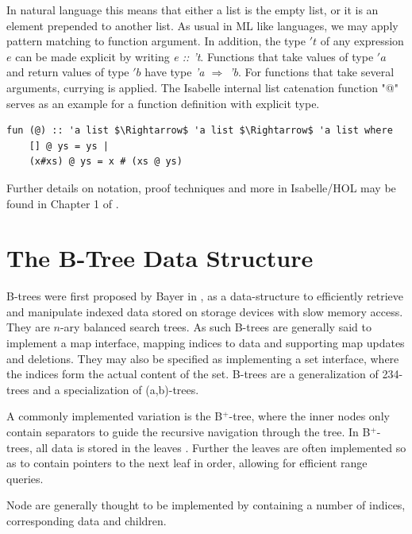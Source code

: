 In natural language this means that either a list is the empty list,
or it is an element prepended to another list.
As usual in ML like languages, we may apply pattern matching to function argument.
In addition, the type $'t$ of any expression $e$ can be
made explicit by writing \textit{e :: 't}.
Functions that take values of type $'a$ and return values of type $'b$ 
have type \textit{'a $\Rightarrow$ 'b}.
For functions that take several arguments,
currying is applied.
The Isabelle internal list catenation function "@" serves as
an example for a function definition with explicit type.

\begin{lstlisting}[mathescape=true, language=Isabelle,label=lst:append-def]
fun (@) :: 'a list $\Rightarrow$ 'a list $\Rightarrow$ 'a list where
    [] @ ys = ys |
    (x#xs) @ ys = x # (xs @ ys)
\end{lstlisting}


Further details on notation, proof techniques and more in Isabelle/HOL
may be found in Chapter 1 of \parencite{DBLP:books/sp/NipkowK14}.


\section{The B-Tree Data Structure}

B-trees were first proposed by Bayer in \parencite{DBLP:journals/acta/BayerM72},
as a data-structure to efficiently retrieve and manipulate
indexed data stored on storage devices with slow memory access.
They are $n$-ary balanced search trees.
As such B-trees are generally said to implement a map interface,
mapping indices to data and supporting map updates and deletions.
They may also be specified as implementing a set interface,
where the indices form the actual content of the set.
B-trees are a generalization of 234-trees and a specialization of (a,b)-trees.

A commonly implemented variation is the B$^+$-tree, where the inner nodes
only contain separators to guide the recursive navigation through the tree.
In B$^+$-trees, all data is stored in the leaves \parencite{DBLP:journals/csur/Comer79}.
Further the leaves are often implemented so as to contain pointers
to the next leaf in order, allowing for efficient range queries.

Node are generally thought to be implemented by
containing a number of indices, corresponding data and children.


